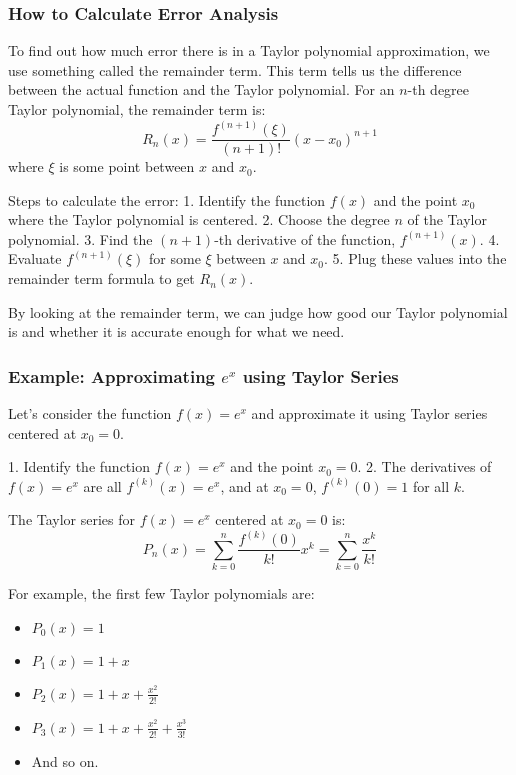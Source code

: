 \documentclass{article}
\begin{document}
\subsubsection*{How to Calculate Error Analysis}
To find out how much error there is in a Taylor polynomial approximation, we use something called the remainder term. This term tells us the difference between the actual function and the Taylor polynomial. For an \( n \)-th degree Taylor polynomial, the remainder term is:
\[ R_n(x) = \frac{f^{(n+1)}(\xi)}{(n+1)!}(x - x_0)^{n+1} \]
where \( \xi \) is some point between \( x \) and \( x_0 \).

Steps to calculate the error:
1. Identify the function \( f(x) \) and the point \( x_0 \) where the Taylor polynomial is centered.
2. Choose the degree \( n \) of the Taylor polynomial.
3. Find the \((n+1)\)-th derivative of the function, \( f^{(n+1)}(x) \).
4. Evaluate \( f^{(n+1)}(\xi) \) for some \( \xi \) between \( x \) and \( x_0 \).
5. Plug these values into the remainder term formula to get \( R_n(x) \).

By looking at the remainder term, we can judge how good our Taylor polynomial is and whether it is accurate enough for what we need.

\subsubsection*{Example: Approximating \( e^x \) using Taylor Series}

Let's consider the function \( f(x) = e^x \) and approximate it using Taylor series centered at \( x_0 = 0 \).

1. Identify the function \( f(x) = e^x \) and the point \( x_0 = 0 \).
2. The derivatives of \( f(x) = e^x \) are all \( f^{(k)}(x) = e^x \), and at \( x_0 = 0 \), \( f^{(k)}(0) = 1 \) for all \( k \).

The Taylor series for \( f(x) = e^x \) centered at \( x_0 = 0 \) is:
\[ P_n(x) = \sum_{k=0}^{n} \frac{f^{(k)}(0)}{k!} x^k = \sum_{k=0}^{n} \frac{x^k}{k!} \]

For example, the first few Taylor polynomials are:
\begin{itemize}
\item \( P_0(x) = 1 \)
\item \( P_1(x) = 1 + x \)
\item \( P_2(x) = 1 + x + \frac{x^2}{2!} \)
\item \( P_3(x) = 1 + x + \frac{x^2}{2!} + \frac{x^3}{3!} \)
\item And so on.
\end{itemize}
\end{document}
